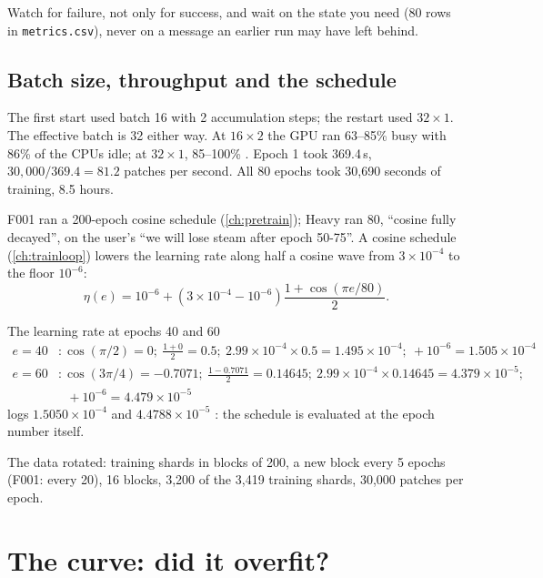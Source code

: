 \begin{keypoint}
Watch for failure, not only for success, and wait on the state you need (80 rows in \texttt{metrics.csv}), never
on a message an earlier run may have left behind.
\end{keypoint}

\subsection{Batch size, throughput and the schedule}

The first start used batch 16 with 2 accumulation steps; the restart used $32\times1$. The effective batch is 32
either way. At $16\times2$ the GPU ran 63--85\% busy with 86\% of the CPUs idle; at $32\times1$, 85--100\%
. Epoch 1 took 369.4\,s, $30{,}000/369.4=81.2$ patches per second. All 80 epochs took
30,690 seconds of training, 8.5 hours.

F001 ran a 200-epoch cosine schedule (\cref{ch:pretrain}); Heavy ran 80, ``cosine fully decayed'', on the user's
``we will lose steam after epoch 50-75''. A cosine schedule (\cref{ch:trainloop}) lowers the learning rate along
half a cosine wave from $3\times10^{-4}$ to the floor $10^{-6}$:
\begin{equation}\label{eq:heavy:cosine}
\eta(e) = 10^{-6} + \left(3\times10^{-4}-10^{-6}\right)\frac{1+\cos(\pi e/80)}{2}.
\end{equation}

\begin{worked}[label={we:heavy:lr}]{The learning rate at epochs 40 and 60}
\begin{align*}
e=40 &: \cos(\pi/2) = 0;\ \tfrac{1+0}{2} = 0.5;\ 2.99\times10^{-4}\times0.5 = 1.495\times10^{-4};\ +10^{-6} = 1.505\times10^{-4}\\
e=60 &: \cos(3\pi/4) = -0.7071;\ \tfrac{1-0.7071}{2} = 0.14645;\ 2.99\times10^{-4}\times0.14645 = 4.379\times10^{-5};\\
&\phantom{:}\ +10^{-6} = 4.479\times10^{-5}
\end{align*}
 logs $1.5050\times10^{-4}$ and $4.4788\times10^{-5}$ : the schedule
is evaluated at the epoch number itself.
\end{worked}

The data rotated: training shards in blocks of 200, a new block every 5 epochs (F001: every 20), 16 blocks, 3,200
of the 3,419 training shards, 30,000 patches per epoch.

\section{The curve: did it overfit?}\label{sec:heavy:curve}

